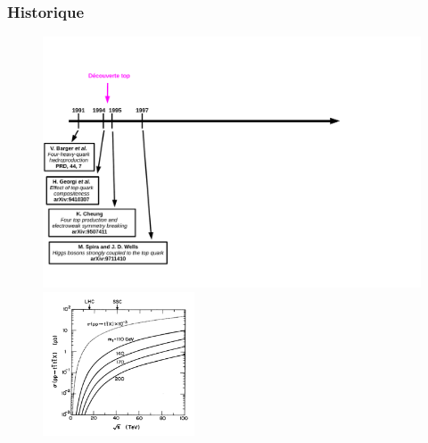 \begin{frame}
\frametitle{Historique}

\begin{figure}[!htb]
\begin{center}
\vspace*{-0.8cm}
\hspace*{-0.5cm}
\includegraphics[width=1.13\textwidth]{friseChrono4tops_1.pdf}
\vspace*{-5cm}
\hspace*{1cm}
\includegraphics[width=0.4\textwidth]{Figures/FourTops/4topCalculationsFromBarger91.png}
\end{center}
\end{figure}
\end{frame}

